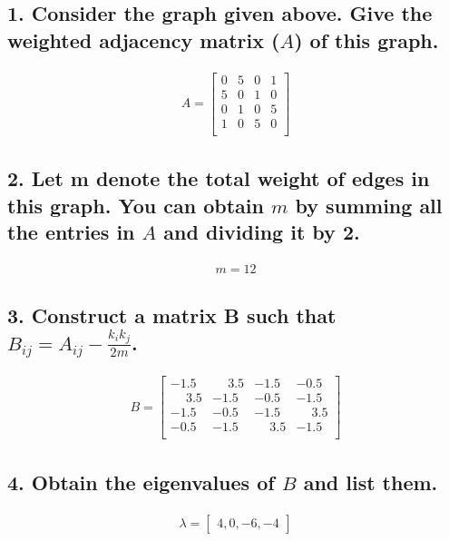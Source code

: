 \documentclass{tufte-handout}
\begin{document}
\subsection{1. Consider the graph given above. Give the weighted adjacency matrix ($A$) of this graph.}

\begin{align*}
A =
\begin{bmatrix}
  0 & 5 & 0 & 1 \\
  5 & 0 & 1 & 0 \\
  0 & 1 & 0 & 5 \\
  1 & 0 & 5 & 0 \\
\end{bmatrix}
\end{align*}

\subsection{2. Let m denote the total weight of edges in this graph. You can obtain $m$ by summing all the entries in $A$ and dividing it by 2.}

\begin{align*}
m = 12
\end{align*}


\subsection{3. Construct a matrix B such that $B_{ij} =A_{ij} - \frac{k_ik_j}{2m}$.}

\begin{align*}
B =
\begin{bmatrix}
-1.5 & \phantom{-}3.5 & -1.5 & -0.5 \\
\phantom{-}3.5 & -1.5 & -0.5 & -1.5 \\
-1.5 & -0.5 & -1.5 & \phantom{-}3.5 \\
-0.5 & -1.5 & \phantom{-}3.5 & -1.5 \\
\end{bmatrix}
\end{align*}

\subsection{4. Obtain the eigenvalues of $B$ and list them.}
\begin{align*}
\lambda =
\begin{bmatrix} 4, 0, -6, -4
\end{bmatrix}
\end{align*}
\end{document}
